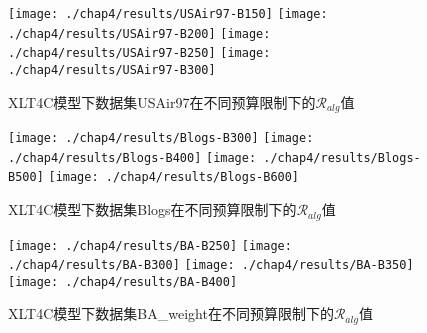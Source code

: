 \begin{figure}[H]
	\centering%
	{\texttt{[image: ./chap4/results/USAir97-B150]}}
	\hspace{3em}
	{\texttt{[image: ./chap4/results/USAir97-B200]}}
	\hspace{3em}
	{\texttt{[image: ./chap4/results/USAir97-B250]}}
	\hspace{3em}
	{\texttt{[image: ./chap4/results/USAir97-B300]}}
	\caption{XLT4C模型下数据集USAir97在不同预算限制下的$\mathcal{R}_{alg}$值}
	\label{fig:chap4-usair97-result}
\end{figure}

\begin{figure}[H]
	\centering%
	{\texttt{[image: ./chap4/results/Blogs-B300]}}
	\hspace{3em}
	{\texttt{[image: ./chap4/results/Blogs-B400]}}
	\hspace{3em}
	{\texttt{[image: ./chap4/results/Blogs-B500]}}
	\hspace{3em}
	{\texttt{[image: ./chap4/results/Blogs-B600]}}
	\caption{XLT4C模型下数据集Blogs在不同预算限制下的$\mathcal{R}_{alg}$值}
	\label{fig:chap4-blogs-result}
\end{figure}

\begin{figure}[H]
	\centering%
	{\texttt{[image: ./chap4/results/BA-B250]}}
	\hspace{3em}
	{\texttt{[image: ./chap4/results/BA-B300]}}
	\hspace{3em}
	{\texttt{[image: ./chap4/results/BA-B350]}}
	\hspace{3em}
	{\texttt{[image: ./chap4/results/BA-B400]}}
	\caption{XLT4C模型下数据集BA\_weight在不同预算限制下的$\mathcal{R}_{alg}$值}
	\label{fig:chap4-ba-result}
\end{figure}

